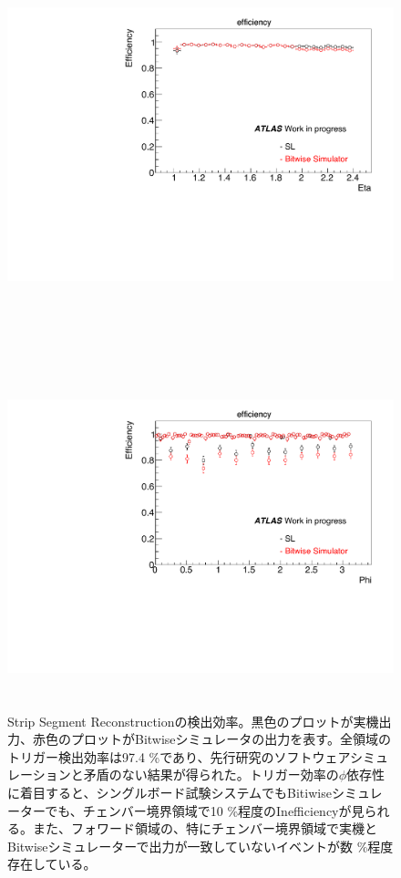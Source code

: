 \begin{figure}
\begin{minipage}[b]{\linewidth}
\centering
\includegraphics[height=10cm]{fig/Test/A_SM_strip_eta.pdf}
\end{minipage}\\
\begin{minipage}[b]{\linewidth}
\centering
\includegraphics[height=10cm]{fig/Test/A_SM_strip_phi.pdf}
\end{minipage}%
\caption[Strip Segment Reconstructionの検出効率]{Strip Segment Reconstructionの検出効率。黒色のプロットが実機出力、赤色のプロットがBitwiseシミュレータの出力を表す。全領域のトリガー検出効率は97.4 \%であり、先行研究のソフトウェアシミュレーションと矛盾のない結果が得られた。トリガー効率の$\phi$依存性に着目すると、シングルボード試験システムでもBitiwiseシミュレーターでも、チェンバー境界領域で10 \%程度のInefficiencyが見られる。また、フォワード領域の、特にチェンバー境界領域で実機とBitwiseシミュレーターで出力が一致していないイベントが数 \%程度存在している。}
\label{SM_A_strip}
\end{figure}



